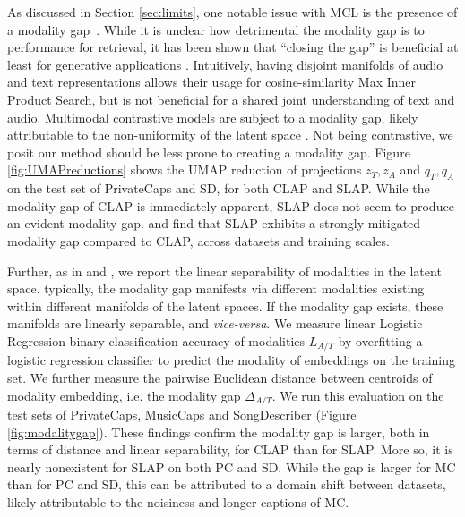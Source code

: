 \documentclass{article}
\begin{document}
As discussed in Section \ref{sec:limits}, one notable issue with MCL is the presence of a modality gap~\cite{liang2022mind,Fahim2024}.
While it is unclear how detrimental the modality gap is to performance for retrieval, it has been shown that ``closing the gap'' is beneficial at least for generative applications \cite{nistal2024improving}.
Intuitively, having disjoint manifolds of audio and text representations allows their usage for cosine-similarity Max Inner Product Search, but is not beneficial for a shared joint understanding of text and audio. Multimodal contrastive models are subject to a modality gap, likely attributable to the non-uniformity of the latent space \cite{Fahim2024}. Not being contrastive, we posit our method should be less prone to creating a modality gap. Figure \ref{fig:UMAPreductions} shows the UMAP reduction of projections $z_T,z_A$ and $q_T,q_A$ on the test set of PrivateCaps and SD, for both CLAP and SLAP. While the modality gap of CLAP is immediately apparent, SLAP does not seem to produce an evident modality gap. and find that SLAP exhibits a strongly mitigated modality gap compared to CLAP, across datasets and training scales. 

Further, as in \cite{Fahim2024} and \cite{liang2022mind}, we report the linear separability of modalities in the latent space. typically, the modality gap manifests via different modalities existing within different manifolds of the latent spaces. If the modality gap exists, these manifolds are linearly separable, and \textit{vice-versa}. We measure linear Logistic Regression binary classification accuracy of modalities $L_{A/T}$ by overfitting a logistic regression classifier to predict the modality of embeddings on the training set. We further measure the pairwise Euclidean distance between centroids of modality embedding, i.e. the modality gap $\Delta_{A/T}$. We run this evaluation on the test sets of PrivateCaps, MusicCaps and SongDescriber (Figure \ref{fig:modalitygap}).
These findings confirm the modality gap is larger, both in terms of distance and linear separability, for CLAP than for SLAP. More so, it is nearly nonexistent for SLAP on both PC and SD. While the gap is larger for MC than for PC and SD, this can be attributed to a domain shift between datasets, likely attributable to the noisiness and longer captions of MC.
\end{document}
